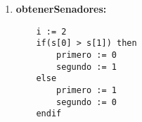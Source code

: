 \documentclass[10pt,a4paper]{article}
\begin{document}
\begin{enumerate}
\newpage

\item \textbf{obtenerSenadores:}
\begin{lstlisting}
    i := 2
    if(s[0] > s[1]) then
        primero := 0
        segundo := 1
    else
        primero := 1
        segundo := 0
    endif


\end{lstlisting}
\end{enumerate}
\end{document}
